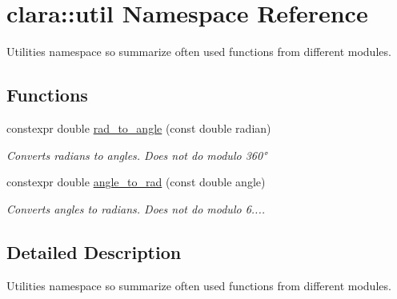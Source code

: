 \hypertarget{namespaceclara_1_1util}{}\section{clara\+:\+:util Namespace Reference}
\label{namespaceclara_1_1util}


Utilities namespace so summarize often used functions from different modules.  


\subsection*{Functions}
\begin{DoxyCompactItemize}
\item 
\mbox{\label{namespaceclara_1_1util_a203083303f1faa63dbff7ad716516b5b}} 
constexpr double \hyperlink{namespaceclara_1_1util_a203083303f1faa63dbff7ad716516b5b}{rad\+\_\+to\+\_\+angle} (const double radian)
\begin{DoxyCompactList}\small\item\em Converts radians to angles. Does not do {\ttfamily modulo 360°} \end{DoxyCompactList}\item 
\mbox{\label{namespaceclara_1_1util_ae062b8c2441737886151170147747c18}} 
constexpr double \hyperlink{namespaceclara_1_1util_ae062b8c2441737886151170147747c18}{angle\+\_\+to\+\_\+rad} (const double angle)
\begin{DoxyCompactList}\small\item\em Converts angles to radians. Does not do {\ttfamily modulo 6....} \end{DoxyCompactList}\end{DoxyCompactItemize}


\subsection{Detailed Description}
Utilities namespace so summarize often used functions from different modules. 


